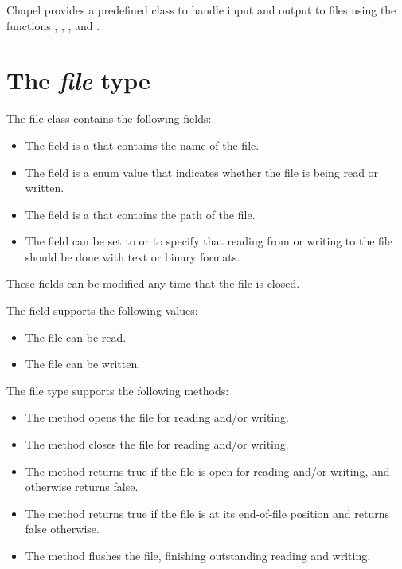 \label{Input_and_Output}

Chapel provides a predefined  class to handle input and
output to files using the functions , ,
, and .

\section{The {\em file} type}

The file class contains the following fields:
\begin{itemize}
\item
The  field is a  that contains the name of
the file.
\item
The  field is a  enum value that indicates
whether the file is being read or written.
\item
The  field is a  that contains the path of the
file.
\item
The  field can be set to  or  to
specify that reading from or writing to the file should be done with
text or binary formats.
\end{itemize}
These fields can be modified any time that the file is closed.

The  field supports the following  values:
\begin{itemize}
\item
{} The file can be read.
\item
{} The file can be written.
\end{itemize}

The file type supports the following methods:
\begin{itemize}
\item
The  method opens the file for reading and/or writing.
\item
The  method closes the file for reading and/or writing.
\item
The  method returns true if the file is open for reading
and/or writing, and otherwise returns false.
\item
The  method returns true if the file is at its end-of-file
position and returns false otherwise.
\item
The  method flushes the file, finishing outstanding
reading and writing.
\end{itemize}


